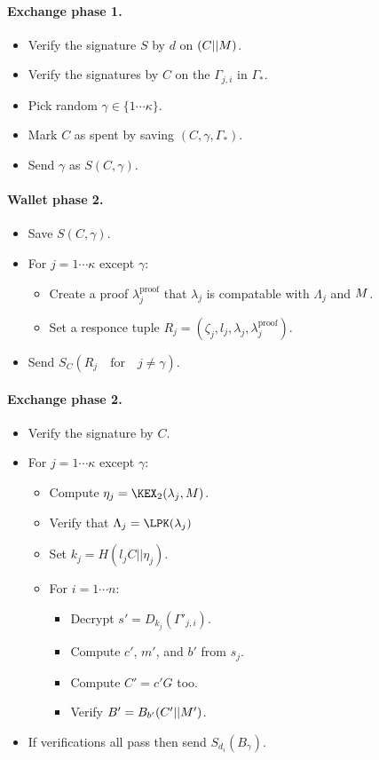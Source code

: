 \documentclass{llncs}
\begin{document}
\paragraph{Exchange phase 1.}
\begin{itemize}
\item  Verify the signature $S$ by $d$ on $(C || M)$.
\item  Verify the signatures by $C$ on the $\Gamma_{j,i}$ in $\Gamma_*$.
\item  Pick random $\gamma \in \{1 \cdots \kappa\}$.
\item  Mark $C$ as spent by saving $(C,\gamma,\Gamma_*)$.
\item  Send $\gamma$ as $S(C,\gamma)$.
\end{itemize}

\paragraph{Wallet phase 2.}
\begin{itemize}
\item  Save $S(C,\gamma)$.
\item  For $j = 1 \cdots \kappa$ except $\gamma$:
   \begin{itemize}
   \item  Create a proof $\lambda_j^{\textrm{proof}}$ that
          $\lambda_j$ is compatable with $\Lambda_j$ and $M$.
   \item  Set a responce tuple
          $R_j = (\zeta_j,l_j,\lambda_j,\lambda_j^{\textrm{proof}})$.
   \end{itemize}
\item  Send $S_C(R_j \quad\textrm{for}\quad j \ne \gamma )$.
\end{itemize}

\paragraph{Exchange phase 2.}
\begin{itemize}
\item  Verify the signature by $C$.
\item  For $j = 1 \cdots \kappa$ except $\gamma$:
   \begin{itemize}
   \item  Compute $\eta_j = \KEX_2(\lambda_j,\Mu)$.
   \item  Verify that $\Lambda_j = \LPK(\lambda_j)$
   \item  Set $k_j = H(l_j C || \eta_j)$.
   \item  For $i=1 \cdots n$:
     \begin{itemize}
     \item  Decrypt $s' = D_{k_j}(\Gamma'_{j,i})$.
     \item  Compute $c'$, $m'$, and $b'$ from $s_j$.
     \item  Compute $C' = c' G$ too.
     \item  Verify $B' = B_{b'}(C' || M')$.
     \end{itemize}
   \end{itemize}
\item  If verifications all pass then send $S_{d_i}(B_\gamma)$.
\end{itemize}
\end{document}
